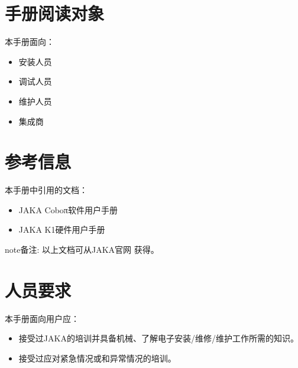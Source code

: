 \documentclass[a4paper,11pt,english,openany,oneside]{sphinxmanual}
\begin{document}
\section{手册阅读对象}
\label{\detokenize{04 _u624b_u518c_u6982_u8ff0:id3}}
\sphinxAtStartPar
本手册面向：
\begin{itemize}
\item {} 
\sphinxAtStartPar
安装人员

\item {} 
\sphinxAtStartPar
调试人员

\item {} 
\sphinxAtStartPar
维护人员

\item {} 
\sphinxAtStartPar
集成商

\end{itemize}


\section{参考信息}
\label{\detokenize{04 _u624b_u518c_u6982_u8ff0:id4}}
\sphinxAtStartPar
本手册中引用的文档：
\begin{itemize}
\item {} 
\sphinxAtStartPar
JAKA Coboπ软件用户手册

\item {} 
\sphinxAtStartPar
JAKA K1硬件用户手册

\end{itemize}

\begin{sphinxadmonition}{note}{备注:}
\sphinxAtStartPar
以上文档可从JAKA官网  获得。
\end{sphinxadmonition}


\section{人员要求}
\label{\detokenize{04 _u624b_u518c_u6982_u8ff0:id5}}
\sphinxAtStartPar
本手册面向用户应：
\begin{itemize}
\item {} 
\sphinxAtStartPar
接受过JAKA的培训并具备机械、了解电子安装/维修/维护工作所需的知识。

\item {} 
\sphinxAtStartPar
接受过应对紧急情况或和异常情况的培训。

\end{itemize}

\sphinxstepscope
\end{document}
